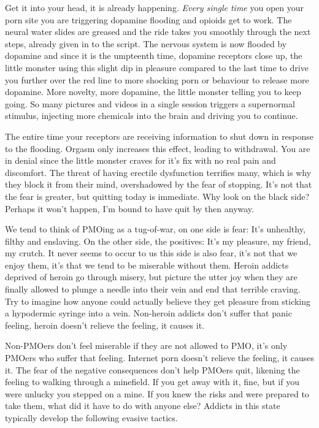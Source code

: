 \documentclass[easypeasy.tex]{subfiles}
\begin{document}
Get it into your head, it is already happening. \textit{Every single time} you open your porn site you are triggering dopamine flooding and opioids get to work. The neural water slides are greased and the ride takes you smoothly through the next steps, already given in to the script. The nervous system is now flooded by dopamine and since it is the umpteenth time, dopamine receptors close up, the little monster using this slight dip in pleasure compared to the last time to drive you further over the red line to more shocking porn or behaviour to release more dopamine. More novelty, more dopamine, the little monster telling you to keep going. So many pictures and videos in a single session triggers a supernormal stimulus, injecting more chemicals into the brain and driving you to continue.

The entire time your receptors are receiving information to shut down in response to the flooding. Orgasm only increases this effect, leading to withdrawal. You are in denial since the little monster craves for it's fix with no real pain and discomfort. The threat of having erectile dysfunction terrifies many, which is why they block it from their mind, overshadowed by the fear of stopping. It's not that the fear is greater, but quitting today is immediate. Why look on the black side? Perhaps it won't happen, I'm bound to have quit by then anyway.

We tend to think of PMOing as a tug-of-war, on one side is fear: It's unhealthy, filthy and enslaving. On the other side, the positives: It's my pleasure, my friend, my crutch. It never seems to occur to us this side is also fear, it's not that we enjoy them, it's that we tend to be miserable without them. Heroin addicts deprived of heroin go through misery, but picture the utter joy when they are finally allowed to plunge a needle into their vein and end that terrible craving. Try to imagine how anyone could actually believe they get pleasure from sticking a hypodermic syringe into a vein. Non-heroin addicts don't suffer that panic feeling, heroin doesn't relieve the feeling, it causes it.

Non-PMOers don't feel miserable if they are not allowed to PMO, it's only PMOers who suffer that feeling. Internet porn doesn't relieve the feeling, it causes it. The fear of the negative consequences don't help PMOers quit, likening the feeling to walking through a minefield. If you get away with it, fine, but if you were unlucky you stepped on a mine. If you knew the risks and were prepared to take them, what did it have to do with anyone else? Addicts in this state typically develop the following evasive tactics.
\end{document}
